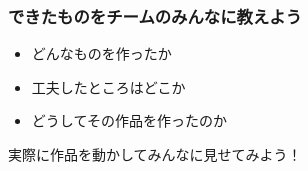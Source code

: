 \documentclass[slide05.tex]{subfiles}
\begin{document}
\begin{frame}[fragile]
    \frametitle{できたものをチームのみんなに教えよう}
    \begin{center}
        \begin{itemize}
            \item どんなものを作ったか
            \item 工夫したところはどこか
            \item どうしてその作品を作ったのか
        \end{itemize}
    \end{center}
    {実際に作品を動かしてみんなに見せてみよう！}
\end{frame}
\end{document}
